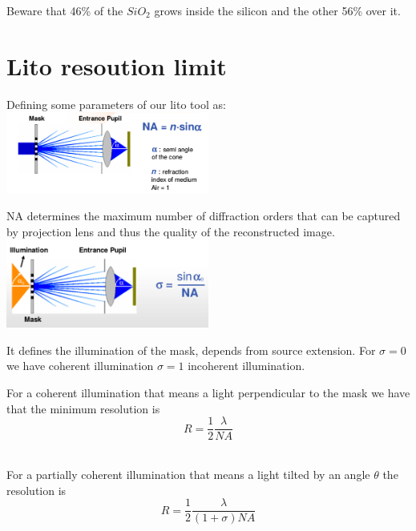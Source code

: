 Beware that 46\% of the $SiO_2$ grows inside the silicon and the other 56\% over it.\\


\section{Lito resoution limit}
Defining some parameters of our lito tool as:\\

\centering
\includegraphics[width=0.5\textwidth]{NA.png}\\
\raggedright

NA determines the maximum number of diffraction orders that can be captured by projection lens and thus the quality of the reconstructed image.\\

\centering
\includegraphics[width=0.5\textwidth]{sigma.png}\\
\raggedright

It defines the illumination of the mask, depends from source extension. For $\sigma=0$ we have coherent illumination $\sigma=1$ incoherent illumination.\\

\vspace{3mm}

For a coherent illumination that means a light perpendicular to the mask we have that the minimum resolution is 
\begin{equation}
R=\frac{1}{2}\frac{\lambda}{NA}
\end{equation}
\\
\vspace{3mm}

For a partially coherent illumination that means a light tilted by an angle $\theta$ the resolution is
\begin{equation}
R=\frac{1}{2}\frac{\lambda}{(1+\sigma)NA}
\end{equation}
\\

